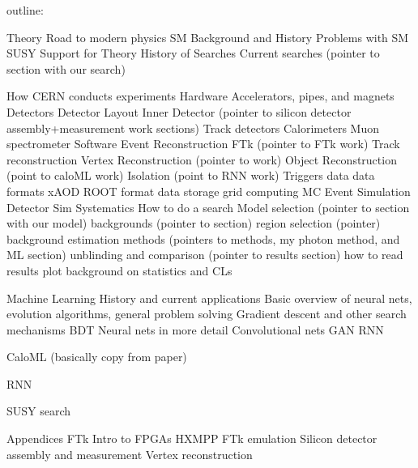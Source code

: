 outline:

Theory
    Road to modern physics
    SM
        Background and History
        Problems with SM
    SUSY
        Support for Theory
        History of Searches
        Current searches (pointer to section with our search)

How CERN conducts experiments
    Hardware
        Accelerators, pipes, and magnets
        Detectors
        Detector Layout
        Inner Detector (pointer to silicon detector assembly+measurement work sections)
        Track detectors
        Calorimeters
        Muon spectrometer
    Software
        Event Reconstruction
            FTk (pointer to FTk work)
            Track reconstruction
            Vertex Reconstruction (pointer to work)
            Object Reconstruction (point to caloML work)
            Isolation (point to RNN work)
            Triggers
        data
            data formats
                xAOD
                ROOT format
            data storage
                grid computing
        MC
            Event Simulation
            Detector Sim
            Systematics
    How to do a search
        Model selection (pointer to section with our model)
        backgrounds (pointer to section)
        region selection (pointer)
        background estimation methods (pointers to methods, my photon method, and ML section)
        unblinding and comparison (pointer to results section)
        how to read results plot
            background on statistics and CLs

Machine Learning
    History and current applications
    Basic overview of neural nets, evolution algorithms, general problem solving
        Gradient descent and other search mechanisms
    BDT
    Neural nets in more detail
    Convolutional nets
    GAN
    RNN
    
CaloML (basically copy from paper)

RNN

SUSY search

Appendices
    FTk
        Intro to FPGAs
        HXMPP
        FTk emulation
    Silicon detector assembly and measurement
    Vertex reconstruction